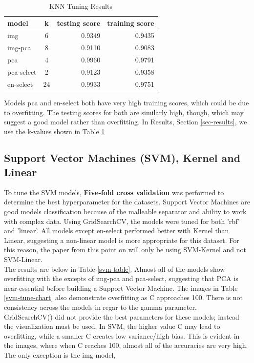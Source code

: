 \documentclass{article}
\begin{document}
\begin{table}[H]
    \centering
    \begin{tabular}{lcrr} \toprule
       model & k & testing score & training score\\ \hline
       img & 6 & 0.9349 & 0.9435\\
       img-pca &  8 &  0.9110 &  0.9083\\
       pca & 4 & 0.9960 & 0.9791\\
       pca-select & 2 & 0.9123 & 0.9358\\
       en-select & 24 & 0.9933 & 0.9751\\
       \bottomrule
    \end{tabular}
    \caption{KNN Tuning Results}
    \label{knn-tune-table}
\end{table}

Models pca and en-select both have very high training scores, which could be due to overfitting. The testing scores for both are similarly high, though, which may suggest a good model rather than overfitting. In Results, Section \ref{sec-results}, we use the k-values shown in Table \ref{knn-tune-table}


\subsection{Support Vector Machines (SVM), Kernel and Linear}

To tune the SVM models, \textbf{Five-fold cross validation} was performed to determine the best hyperparameter for the datasets. Support Vector Machines are good models classification because of the malleable separator and ability to work with complex data. Using GridSearchCV, the models were tuned for both 'rbf' and 'linear'. All models except en-select performed better with Kernel than Linear, suggesting a non-linear model is more appropriate for this dataset. For this reason, the paper from this point on will only be using SVM-Kernel and not SVM-Linear.\\

The results are below in Table \ref{svm-table}. Almost all of the models show overfitting with the excepts of img-pca and pca-select, suggesting that PCA is near-essential before building a Support Vector Machine. The images in Table \ref{svm-tune-chart} also demonstrate overfitting as C approaches 100. There is not consistency across the models in regar to the gamma parameter.\\

GridSearchCV() did not provide the best parameters for these models; instead the visualization must be used. In SVM, the higher value C may lead to overfitting, while a smaller C creates low variance/high bias. This is evident in the images, where when C reaches 100, almost all of the accuracies are very high. The only exception is the img model, 
\end{document}
